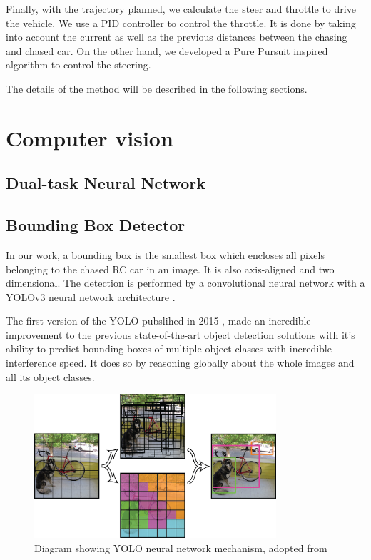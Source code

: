 Finally, with the trajectory planned, we calculate the steer and throttle to drive the vehicle. We use a PID controller \cite{PID_orig} to control the throttle. It is done by taking into account the current as well as the previous distances between the chasing and chased car. On the other hand, we developed a Pure Pursuit \cite{pure_pursuit_orig} inspired algorithm to control the steering. \par

The details of the method will be described in the following sections.

\section{Computer vision}
\subsection{Dual-task Neural Network}

\subsection{Bounding Box Detector}
In our work, a bounding box is the smallest box which encloses all pixels belonging to the chased RC car in an image. It is also axis-aligned and two dimensional. The detection is performed by a convolutional neural network \cite{CNN_Lecun} with a YOLOv3 neural network architecture \cite{YOLOv3}. \par 
The first version of the YOLO pubslihed in 2015 \cite{YOLO}, made an incredible improvement to the previous state-of-the-art object detection solutions with it's ability to predict bounding boxes of multiple object classes with incredible interference speed. It does so by reasoning globally about the whole images and all its object classes. \par
\begin{figure}[h!]
    \centering
    \includegraphics[width=0.8\textwidth]{images/YOLO.png}
    
    \caption{Diagram showing YOLO neural network mechanism, adopted from \protect\cite{YOLO}}\label{f:YOLO}
\end{figure}


